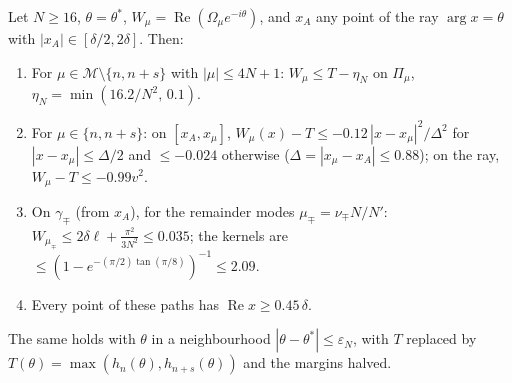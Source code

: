 \documentclass[11pt]{article}
\theoremstyle{definition}\newtheorem{definition}[theorem]{Definition}
\theoremstyle{remark}\newtheorem{remark}[theorem]{Remark}
\begin{document}
\begin{lemma}\label{lem:LS}
Let $N\ge16$, $\theta=\theta^*$, $W_\mu=\operatorname{Re}(\Omega_\mu e^{-i\theta})$, and $x_A$ any point of the ray $\arg x=\theta$ with $|x_A|\in[\delta/2,2\delta]$. Then:
\begin{enumerate}
\item[(a)] For $\mu\in\mathcal M\setminus\{n,n+s\}$ with $|\mu|\le4N+1$: $W_\mu\le T-\eta_N$ on $\Pi_\mu$, $\eta_N=\min(16.2/N^2,\,0.1)$.
\item[(b)] For $\mu\in\{n,n+s\}$: on $[x_A,x_\mu]$, $W_\mu(x)-T\le-0.12\,|x-x_\mu|^2/\Delta^2$ for $|x-x_\mu|\le\Delta/2$ and $\le-0.024$ otherwise ($\Delta=|x_\mu-x_A|\le0.88$); on the ray, $W_\mu-T\le-0.99v^2$.
\item[(c)] On $\gamma_\mp$ (from $x_A$), for the remainder modes $\mu_\mp=\nu_\mp N/N'$: $W_{\mu_\mp}\le2\delta\ell+\frac{\pi^2}{3N^2}\le0.035$; the kernels are $\le(1-e^{-(\pi/2)\tan(\pi/8)})^{-1}\le2.09$.
\item[(d)] Every point of these paths has $\operatorname{Re}x\ge0.45\,\delta$.
\end{enumerate}
The same holds with $\theta$ in a neighbourhood $|\theta-\theta^*|\le\varepsilon_N$, with $T$ replaced by $T(\theta)=\max(h_n(\theta),h_{n+s}(\theta))$ and the margins halved.
\end{lemma}
\end{document}
